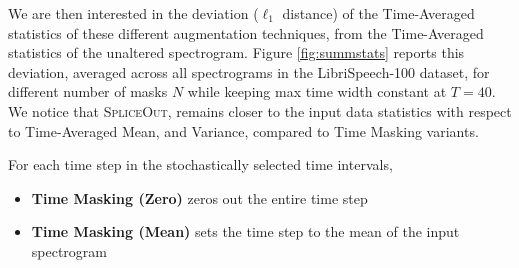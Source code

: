 \documentclass{article}
\newcommand{\SpA}{{\textsc{SpliceOut}}\xspace}
\begin{document}
We are then interested in the deviation ($\ell_1$ distance) of the Time-Averaged statistics of these different augmentation techniques, from the Time-Averaged statistics of the unaltered spectrogram. Figure \ref{fig:summstats} reports this deviation, averaged across all spectrograms in the LibriSpeech-100 dataset, for different number of masks $N$ while keeping max time width constant at $T=40$. We notice that \SpA, remains closer to the input data statistics with respect to Time-Averaged Mean, and Variance, compared to Time Masking variants. 





For each time step in the stochastically selected time intervals,
\begin{itemize}[leftmargin=*]
    \item[] \textbf{Time Masking (Zero)} zeros out the entire time step~\citep{specaugment}
    \item[] \textbf{Time Masking (Mean)} sets the time step to the mean of the input spectrogram~\citep{specaugment,espnet,speechbrain} %
\end{itemize}
\fi

\end{document}
